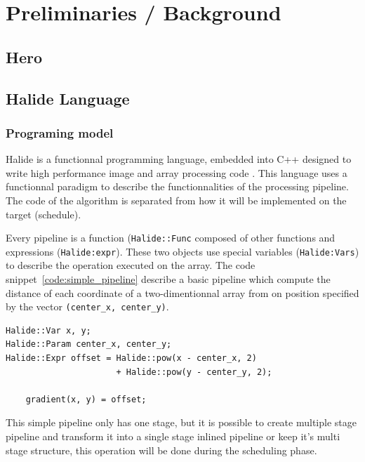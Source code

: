 
\chapter{Preliminaries / Background}
\section{Hero}
\section{Halide Language}
	\subsection { Programing model}
		Halide is a functionnal programming language,  embedded into C++ designed to write high performance image and array processing code \cite{Web:Halide}. This language uses a functionnal paradigm to describe the functionnalities of the processing pipeline. The code of the algorithm is separated from how it will be implemented on the  target (schedule). 


		Every pipeline is a function (\verb|Halide::Func| composed of other functions and expressions (\verb|Halide:expr|). These two objects  use special variables (\verb|Halide:Vars|) to describe the operation executed on the array. The code snippet~\ref{code:simple_pipeline} 
		describe a basic pipeline which compute the distance of each coordinate of a two-dimentionnal array from on position specified by the vector \verb|(center_x, center_y)|.


\lstset{basicstyle=\ttfamily\footnotesize,breaklines=true,tabsize=2}
\begin{lstlisting}[caption={Simple Pipeline Example}, captionpos=b, label={code:simple_pipeline}]
Halide::Var x, y;
Halide::Param center_x, center_y;
Halide::Expr offset = Halide::pow(x - center_x, 2) 
                      + Halide::pow(y - center_y, 2);

	gradient(x, y) = offset;
\end{lstlisting}
	This simple pipeline only has one stage, but it is possible to create multiple stage pipeline and transform it into a single stage inlined pipeline or keep it's multi stage structure, this operation will be done during the scheduling phase.

